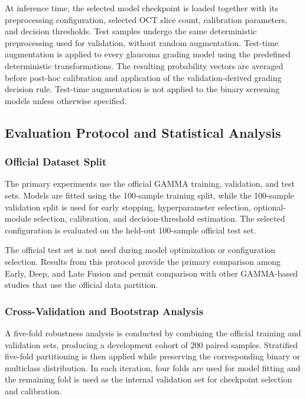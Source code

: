 \documentclass[preprint,12pt]{elsarticle}
\begin{document}
At inference time, the selected model checkpoint is loaded together with its preprocessing configuration, selected OCT slice count, calibration parameters, and decision thresholds. Test samples undergo the same deterministic preprocessing used for validation, without random augmentation. Test-time augmentation is applied to every glaucoma grading model using the predefined deterministic transformations. The resulting probability vectors are averaged before post-hoc calibration and application of the validation-derived grading decision rule. Test-time augmentation is not applied to the binary screening models unless otherwise specified.

\subsection{Evaluation Protocol and Statistical Analysis}
\label{subsec:evaluation_protocol}

\subsubsection{Official Dataset Split}
\label{subsubsec:official_split}

The primary experiments use the official GAMMA training, validation, and test sets. Models are fitted using the 100-sample training split, while the 100-sample validation split is used for early stopping, hyperparameter selection, optional-module selection, calibration, and decision-threshold estimation. The selected configuration is evaluated on the held-out 100-sample official test set.

The official test set is not used during model optimization or configuration selection. Results from this protocol provide the primary comparison among Early, Deep, and Late Fusion and permit comparison with other GAMMA-based studies that use the official data partition.

\subsubsection{Cross-Validation and Bootstrap Analysis}
\label{subsubsec:robustness_analysis}

A five-fold robustness analysis is conducted by combining the official training and validation sets, producing a development cohort of 200 paired samples. Stratified five-fold partitioning is then applied while preserving the corresponding binary or multiclass distribution. In each iteration, four folds are used for model fitting and the remaining fold is used as the internal validation set for checkpoint selection and calibration.
\end{document}
